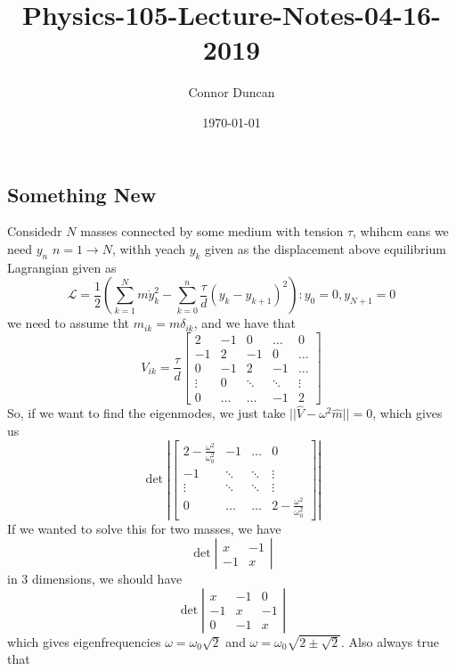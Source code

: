 \documentclass{article} \usepackage{amsmath} \usepackage{amssymb} \usepackage{amsthm} \usepackage[margin=0.2in]{geometry} \usepackage{hyperref} \usepackage{physics} \usepackage{tikz} \usepackage{mathtools} \mathtoolsset{showonlyrefs} \theoremstyle{definition} \newtheorem{theorem}{Theorem}[section] \newtheorem{corollary}{Corollary}[theorem] \newtheorem{lemma}[theorem]{Lemma} \newtheorem{definition}{Definition}[section] \author{Connor Duncan} \date{\today}
\title{Physics-105-Lecture-Notes-04-16-2019}
\begin{document}
\maketitle\tableofcontents
\noindent{}
\subsection{Something New} Considedr $N$ masses connected by some medium with tension $\tau$, whihcm eans we need $y_n$ $n=1\rightarrow N$, withh yeach $y_k$ given as the displacement above equilibrium Lagrangian given as \begin{equation} \mathcal L=\frac{1}{2}\left(\sum_{k=1}^Nm\dot y_k^2-\sum_{k=0}^n\frac{\tau}{d}(y_k-y_{k+1})^2\right):y_0=0,y_{N+1}=0 \end{equation} we need to assume tht $m_{ik}=m\delta_{ik}$, and we have that \begin{equation} V_{ik}=\frac{\tau}{d} \begin{bmatrix} 2 & -1 & 0 & \ldots & 0\\ -1 & 2 & -1 & 0 & \ldots\\ 0 & -1 & 2 & -1 & \ldots\\ \vdots & 0 & \ddots & \ddots & \vdots\\ 0 & \ldots & \ldots & -1 & 2 \end{bmatrix} \end{equation} So, if we want to find the eigenmodes, we just take $||\hat V-\omega^2\hat m||=0$, which gives us \begin{equation} \det\left|\begin{bmatrix} 2-\frac{\omega^2}{\omega_0^2} & -1 & \ldots & 0\\ -1 & \ddots & \ddots & \vdots\\ \vdots & \ddots & \ddots & \vdots\\ 0 & \ldots & \ldots & 2-\frac{\omega^2}{\omega_0^2} \end{bmatrix} \right| \end{equation} If we wanted to solve this for two masses, we have \begin{equation} \det\left|\begin{matrix} x & -1\\ -1 & x \end{matrix} \right| \end{equation} in 3 dimensions, we should have \begin{equation} \det\left|\begin{matrix} x & -1 & 0\\ -1 & x & -1\\ 0 & -1 & x \end{matrix} \right| \end{equation} which gives eigenfrequencies $\omega=\omega_0\sqrt{2}$ and $\omega=\omega_0\sqrt{2\pm\sqrt{2}}$. Also always true that 
\end{document}
